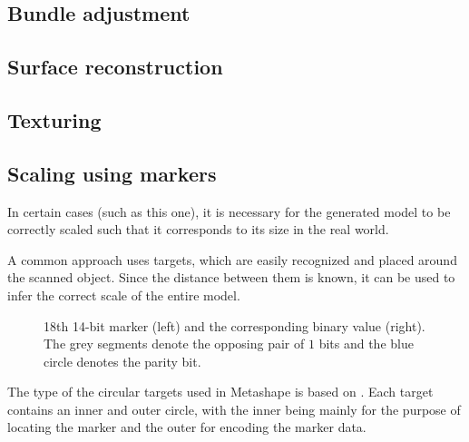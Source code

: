 \subsection{Bundle adjustment}

\subsection{Surface reconstruction}

\subsection{Texturing}
%

\subsection{Scaling using markers}
In certain cases (such as this one), it is necessary for the generated model to be correctly scaled such that it corresponds to its size in the real world.

A common approach uses targets, which are easily recognized and placed around the scanned object.
Since the distance between them is known, it can be used to infer the correct scale of the entire model.

\begin{figure}
\centering
	
	\caption{18th 14-bit marker (left) and the corresponding binary value (right). The grey segments denote the opposing pair of $1$ bits and the blue circle denotes the parity bit. }
\end{figure}

The type of the circular targets used in Metashape is based on \citet{schneider19913,borisPatent}.
Each target contains an inner and outer circle, with the inner being mainly for the purpose of locating the marker and the outer for encoding the marker data.

